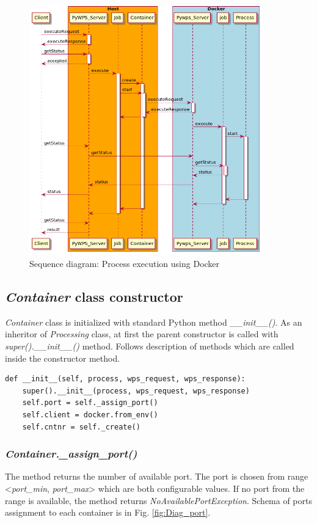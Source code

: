\documentclass[12pt,a4paper]{article}
\begin{document}
\bigskip
\begin{figure}[h!]
\centering
\includegraphics[width=0.9\textwidth]{img/Diag_sequence.png}
\caption{Sequence diagram: Process execution using Docker}
\label{fig:Diag_sequence}
\end{figure}

\subsection{\textit{Container} class constructor}
\label{sub:Container_init}
\textit{Container} class is initialized with standard Python method \textit{\_\_init\_\_()}. As an inheritor of \textit{Processing}
class, at first the parent constructor is called with \textit{super().\_\_init\_\_()} method. Follows description of methods which are
called inside the constructor method.

\bigskip
\begin{lstlisting}[basicstyle=\small,caption={\textit{Container} class constructor},label={lst:Container_constructor}]
def __init__(self, process, wps_request, wps_response):
    super().__init__(process, wps_request, wps_response)
    self.port = self._assign_port()
    self.client = docker.from_env()
    self.cntnr = self._create()
\end{lstlisting}

\subsubsection{\textit{Container.\_assign\_port()}}
The method returns the number of available port. The port is chosen from range <\textit{port\_min},
\textit{port\_max}> which are both configurable values. If no port from the range is available, the method returns
\textit{NoAvailablePortException}. Schema of ports assignment to each container is in Fig. \ref{fig:Diag_port}.
\end{document}
